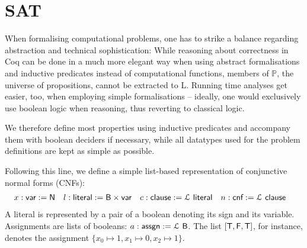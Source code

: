 \documentclass[a4paper,UKenglish,cleveref, autoref]{lipics-v2019}
\begin{document}
\section{SAT}
\newcommand{\var}{\textsf{var}}
\newcommand{\literal}{\textsf{literal}}
\newcommand{\clause}{\textsf{clause}}
\newcommand{\cnf}{\textsf{cnf}}
\newcommand{\assgn}{\textsf{assgn}}

\newcommand*{\eval}[2]{\mathcal{E}~#1~#2~}
\newcommand*{\meval}[3]{\overline{\mathcal{E}}~#1~#2~#3~}

When formalising computational problems, one has to strike a balance regarding abstraction and technical sophistication: While reasoning about correctness in Coq can be done in a much more elegant way when using abstract formalisations and inductive predicates instead of computational functions, members of $\mathbb{P}$, the universe of propositions, cannot be extracted to L. Running time analyses get easier, too, when employing simple formalisations -- ideally, one would exclusively use boolean logic when reasoning, thus reverting to classical logic. 

We therefore define most properties using inductive predicates and accompany them with boolean deciders if necessary, while all datatypes used for the problem definitions are kept as simple as possible.

Following this line, we define a simple list-based representation of conjunctive normal forms (CNFs):
\begin{align*}
  x : \var := \nat &&
  l : \literal := \bool \times \var &&
  c : \clause := \listsof \literal &&
  n : \cnf := \listsof \clause && 
\end{align*}
A literal is represented by a pair of a boolean denoting its sign and its variable. 
Assignments are lists of booleans: $a : \assgn := \listsof \bool$. The list $[\mathsf{T}, \mathsf{F}, \mathsf{T}]$, for instance, denotes the assignment $\{x_0 \mapsto 1, x_1 \mapsto 0, x_2 \mapsto 1\}$. 
  
\end{document}
